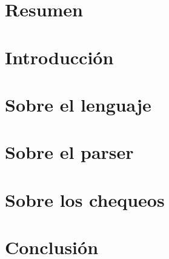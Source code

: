 \documentclass[twoside]{report}
\begin{document}


\chapter*{Resumen}


\tableofcontents

\chapter{Introducción}


\chapter{Sobre el lenguaje}

\chapter{Sobre el parser}



\chapter{Sobre los chequeos}







\chapter{Conclusión}


\printbibliography
\end{document}
